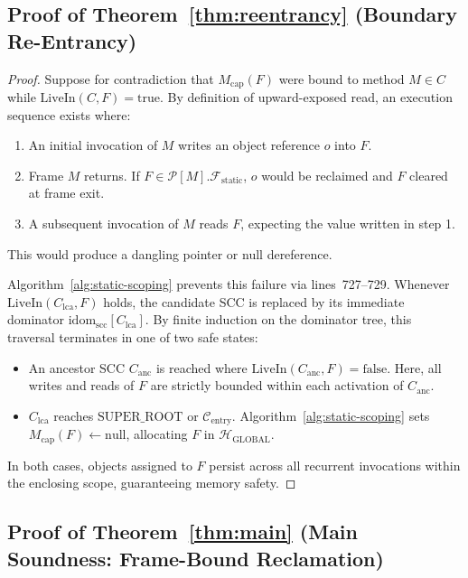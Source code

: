 \documentclass[12pt,a4paper]{article}
\newcommand{\GLOBAL}{\text{GLOBAL}}
\newcommand{\idom}{\text{idom}}
\begin{document}
\subsection{Proof of Theorem~\ref{thm:reentrancy} (Boundary Re-Entrancy)}
\label{sec:proof-thm-reentrancy}

\begin{proof}
Suppose for contradiction that $M_{\text{cap}}(F)$ were bound to method $M \in C$ while $\text{LiveIn}(C, F) = \text{true}$. By definition of upward-exposed read, an execution sequence exists where:
\begin{enumerate}
  \item An initial invocation of $M$ writes an object reference $o$ into $F$.
  \item Frame $M$ returns. If $F \in \mathcal{P}[M].\mathcal{F}_{\text{static}}$, $o$ would be reclaimed and $F$ cleared at frame exit.
  \item A subsequent invocation of $M$ reads $F$, expecting the value written in step 1.
\end{enumerate}
This would produce a dangling pointer or null dereference.

Algorithm~\ref{alg:static-scoping} prevents this failure via lines~727--729. Whenever $\text{LiveIn}(C_{\text{lca}}, F)$ holds, the candidate SCC is replaced by its immediate dominator $\idom_{\text{scc}}[C_{\text{lca}}]$. By finite induction on the dominator tree, this traversal terminates in one of two safe states:
\begin{itemize}[leftmargin=*]
  \item An ancestor SCC $C_{\text{anc}}$ is reached where $\text{LiveIn}(C_{\text{anc}}, F) = \text{false}$. Here, all writes and reads of $F$ are strictly bounded within each activation of $C_{\text{anc}}$.
  \item $C_{\text{lca}}$ reaches $\text{SUPER\_ROOT}$ or $\mathcal{C}_{\text{entry}}$. Algorithm~\ref{alg:static-scoping} sets $M_{\text{cap}}(F) \gets \text{null}$, allocating $F$ in $\mathcal{H}_{\GLOBAL}$.
\end{itemize}
In both cases, objects assigned to $F$ persist across all recurrent invocations within the enclosing scope, guaranteeing memory safety.
\end{proof}

\subsection{Proof of Theorem~\ref{thm:main} (Main Soundness: Frame-Bound Reclamation)}
\label{sec:proof-thm-main}
\end{document}
